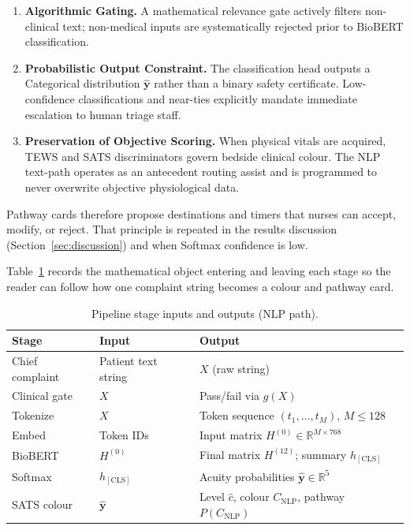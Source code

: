 \begin{enumerate}
\item \textbf{Algorithmic Gating.} A mathematical relevance gate actively filters non-clinical text; non-medical inputs are systematically rejected prior to BioBERT classification.
\item \textbf{Probabilistic Output Constraint.} The classification head outputs a Categorical distribution \(\hat{\mathbf{y}}\) rather than a binary safety certificate. Low-confidence classifications and near-ties explicitly mandate immediate escalation to human triage staff.
\item \textbf{Preservation of Objective Scoring.} When physical vitals are acquired, TEWS and SATS discriminators govern bedside clinical colour. The NLP text-path operates as an antecedent routing assist and is programmed to never overwrite objective physiological data.
\end{enumerate}

Pathway cards therefore propose destinations and timers that nurses can accept, modify, or reject. That principle is repeated in the results discussion (Section~\ref{sec:discussion}) and when Softmax confidence is low.

Table~\ref{tab:pipeline-io} records the mathematical object entering and leaving each stage so the reader can follow how one complaint string becomes a colour and pathway card.

\begin{table}[H]
\centering
\small
\begin{tabular}{|p{2.6cm}|p{4.2cm}|p{4.5cm}|}
\hline
\textbf{Stage} & \textbf{Input} & \textbf{Output} \\
\hline
Chief complaint & Patient text string & \(X\) (raw string) \\
Clinical gate & \(X\) & Pass/fail via \(g(X)\) \\
Tokenize & \(X\) & Token sequence \((t_1,\ldots,t_M)\), \(M \leq 128\) \\
Embed & Token IDs & Input matrix \(H^{(0)} \in \mathbb{R}^{M \times 768}\) \\
BioBERT & \(H^{(0)}\) & Final matrix \(H^{(12)}\); summary \(h_{\mathrm{[CLS]}}\) \\
Softmax & \(h_{\mathrm{[CLS]}}\) & Acuity probabilities \(\hat{\mathbf{y}} \in \mathbb{R}^{5}\) \\
SATS colour & \(\hat{\mathbf{y}}\) & Level \(\hat{c}\), colour \(C_{\mathrm{NLP}}\), pathway \(P(C_{\mathrm{NLP}})\) \\
\hline
\end{tabular}
\caption{Pipeline stage inputs and outputs (NLP path).}
\label{tab:pipeline-io}
\end{table}

